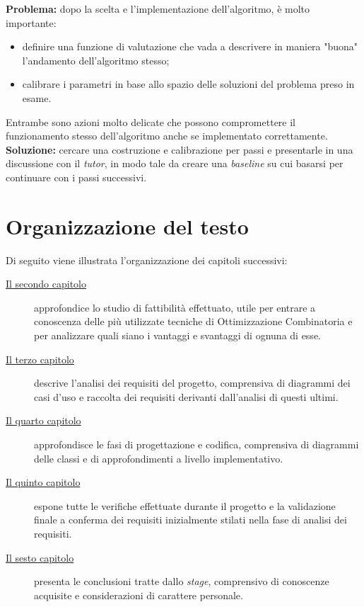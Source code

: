 \begin{enumerate}
    \textbf{Problema:} dopo la scelta e l'implementazione dell'algoritmo, è molto importante:
    \begin{itemize}
        \item definire una funzione di valutazione che vada a descrivere in maniera "buona" l'andamento dell'algoritmo stesso;
        \item calibrare i parametri in base allo spazio delle soluzioni del problema preso in esame.
    \end{itemize}
    Entrambe sono azioni molto delicate che possono compromettere il funzionamento stesso dell'algoritmo anche
    se implementato correttamente.\\[0.2cm]
    \textbf{Soluzione:} cercare una costruzione e calibrazione per passi e presentarle in una discussione con il \textit{tutor},
    in modo tale da creare una \textit{baseline} su cui basarsi per continuare con i passi successivi.

\end{enumerate}

\noindent
\section{Organizzazione del testo}
\noindent Di seguito viene illustrata l'organizzazione dei capitoli successivi:
\begin{description}
    \item[{\hyperref[cap:studio-fattibilita]{Il secondo capitolo}}] 
    approfondice lo studio di fattibilità effettuato, utile per entrare a conoscenza
    delle più utilizzate tecniche di Ottimizzazione Combinatoria e per analizzare
    quali siano i vantaggi e svantaggi di ognuna di esse.
    
    \item[{\hyperref[cap:analisi-requisiti]{Il terzo capitolo}}]
    descrive l'analisi dei requisiti del progetto, comprensiva di diagrammi dei
    casi d'uso e raccolta dei requisiti derivanti dall'analisi di questi ultimi.
    
    \item[{\hyperref[cap:progettazione-codifica]{Il quarto capitolo}}]
    approfondisce le fasi di progettazione e codifica, comprensiva di diagrammi delle classi
    e di approfondimenti a livello implementativo.
    
    \item[{\hyperref[cap:verifica-validazione]{Il quinto capitolo}}]
    espone tutte le verifiche effettuate durante il progetto e la validazione
    finale a conferma dei requisiti inizialmente stilati nella fase di
    analisi dei requisiti.
    
    \item[{\hyperref[cap:conclusioni]{Il sesto capitolo}}]
    presenta le conclusioni tratte dallo \textit{stage}, comprensivo di conoscenze
    acquisite e considerazioni di carattere personale.
\end{description}